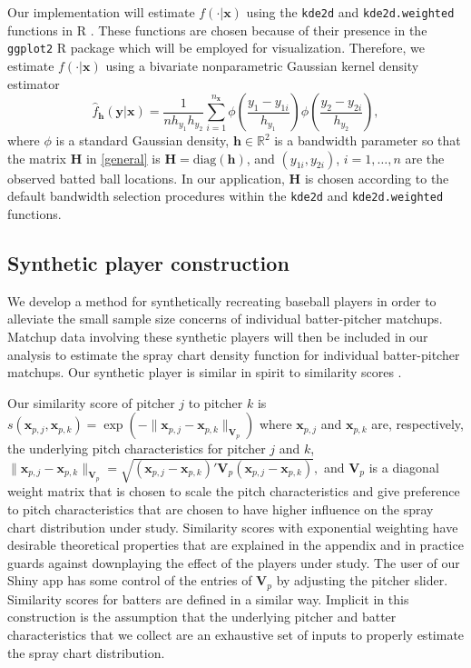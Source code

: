 \documentclass[11pt]{article}
\newcommand{\R}{\mathbb{R}}
\newcommand{\Hbf}{\textbf{H}}
\newcommand{\V}{\textbf{V}}
\newcommand{\y}{\textbf{y}}
\newcommand{\x}{\textbf{x}}
\newcommand{\h}{\textbf{h}}
\begin{document}
Our implementation will estimate $f(\cdot|\x)$ using the \texttt{kde2d} and \texttt{kde2d.weighted} functions in R \citep{MASS, ggtern}. 
These functions are chosen because of their presence 
in the \texttt{ggplot2} R package \citep{ggplot2} which will be employed for visualization. Therefore, we estimate $f(\cdot|\x)$ using a bivariate nonparametric Gaussian kernel density estimator
\begin{equation} \label{spraydens}
  \hat f_\h(\y|\x) = 
    \frac{1}{n h_{y_1}h_{y_2}}\sum_{i=1}^{n_\x} \phi\left(\frac{y_1 - y_{1i}}{h_{y_1}}\right)
      \phi\left(\frac{y_2 - y_{2i}}{h_{y_2}}\right),
\end{equation}
where $\phi$ is a standard Gaussian density, $\h \in \R^2$ is a bandwidth parameter so that the matrix $\Hbf$ in \eqref{general} is $\Hbf = \text{diag}(\h)$, and $(y_{1i},y_{2i})$, $i = 1,\ldots,n$ are the observed batted ball locations. In our application, $\Hbf$ is chosen according to the default bandwidth selection procedures within the \texttt{kde2d} and \texttt{kde2d.weighted} functions.






\subsection{Synthetic player construction}

We develop a method for synthetically recreating baseball players in order to alleviate the small sample size concerns of individual batter-pitcher matchups. Matchup data involving these synthetic players will then be included in our analysis to estimate the spray chart density function for individual batter-pitcher matchups. Our synthetic player is %
similar in spirit to similarity scores \citep{james1994politics, PECOTA}.  

Our similarity score of pitcher $j$ to pitcher $k$ is $s(\x_{p,j}, \x_{p,k}) = \exp(-\|\x_{p,j}-\x_{p,k}\|_{\V_p})$ where $\x_{p,j}$ and $\x_{p,k}$ are, respectively, the underlying pitch characteristics for pitcher $j$ and $k$,
$
 \|\x_{p,j}-\x_{p,k}\|_{\V_p} = \sqrt{(\x_{p,j}-\x_{p,k})'\V_p(\x_{p,j}-\x_{p,k})},
$ 
and $\V_p$ is a diagonal weight matrix that is chosen to scale the pitch characteristics and give preference to pitch characteristics that are chosen to have higher influence on the spray chart distribution under study. Similarity scores with exponential weighting have desirable theoretical properties that are explained in the appendix and in practice guards against downplaying the effect of the players under study. The user of our Shiny app has some control of the entries of $\V_p$ by adjusting the pitcher slider. Similarity scores for batters are defined in a similar way. Implicit in this construction is the assumption that the underlying pitcher and batter characteristics that we collect are an exhaustive set of inputs to properly estimate the spray chart distribution.
\end{document}

